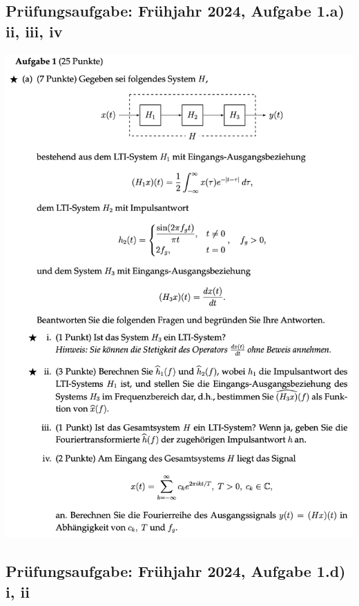 \documentclass[11pt]{article}
\begin{document}
{\vfill \null
\pagebreak

\subsection*{Prüfungsaufgabe: Frühjahr 2024, Aufgabe 1.a) ii, iii, iv }

\includegraphics[width=0.85\linewidth]{docimgs/2024_ex1a.png}

\pagebreak


\pagebreak

\subsection*{Prüfungsaufgabe: Frühjahr 2024, Aufgabe 1.d) i, ii}

}
\end{document}
